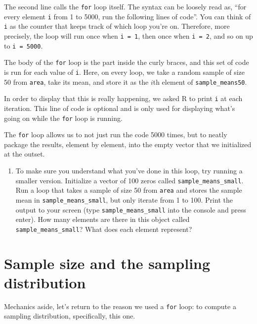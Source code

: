 \documentclass[]{book}
\providecommand{\tightlist}{%
  \setlength{\itemsep}{0pt}\setlength{\parskip}{0pt}}
\theoremstyle{definition}
\theoremstyle{definition}
\theoremstyle{remark}
\begin{document}
The second line calls the \texttt{for} loop itself. The syntax can be
loosely read as, ``for every element \texttt{i} from 1 to 5000, run the
following lines of code''. You can think of \texttt{i} as the counter
that keeps track of which loop you're on. Therefore, more precisely, the
loop will run once when \texttt{i\ =\ 1}, then once when
\texttt{i\ =\ 2}, and so on up to \texttt{i\ =\ 5000}.

The body of the \texttt{for} loop is the part inside the curly braces,
and this set of code is run for each value of \texttt{i}. Here, on every
loop, we take a random sample of size 50 from \texttt{area}, take its
mean, and store it as the \(i\)th element of \texttt{sample\_means50}.

In order to display that this is really happening, we asked R to print
\texttt{i} at each iteration. This line of code is optional and is only
used for displaying what's going on while the \texttt{for} loop is
running.

The \texttt{for} loop allows us to not just run the code 5000 times, but
to neatly package the results, element by element, into the empty vector
that we initialized at the outset.

\begin{enumerate}
\def\labelenumi{\arabic{enumi}.}
\setcounter{enumi}{4}
\tightlist
\item
  To make sure you understand what you've done in this loop, try running
  a smaller version. Initialize a vector of 100 zeros called
  \texttt{sample\_means\_small}. Run a loop that takes a sample of size
  50 from \texttt{area} and stores the sample mean in
  \texttt{sample\_means\_small}, but only iterate from 1 to 100. Print
  the output to your screen (type \texttt{sample\_means\_small} into the
  console and press enter). How many elements are there in this object
  called \texttt{sample\_means\_small}? What does each element
  represent?
\end{enumerate}

\section*{Sample size and the sampling
distribution}\label{sample-size-and-the-sampling-distribution}

Mechanics aside, let's return to the reason we used a \texttt{for} loop:
to compute a sampling distribution, specifically, this one.
\end{document}
